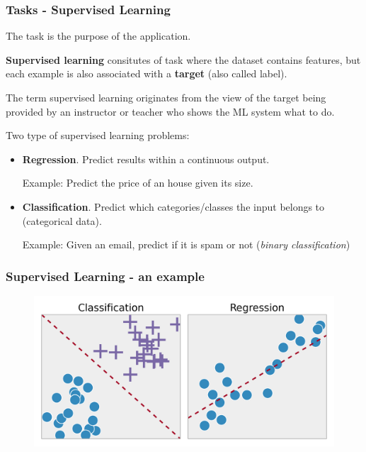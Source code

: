 \documentclass{beamer}
\begin{document}
	\begin{frame}
		\frametitle{Tasks - Supervised Learning}
		The task is the purpose of the application.
		
		\vspace{5mm}
		
		\textbf{Supervised learning} consitutes of task where the dataset contains features, but each example is also associated with a \textbf{target} (also called label).
		
		The term supervised learning originates from the view of the target being provided by an instructor or teacher who shows the ML system what to do.
		
		Two type of supervised learning problems:
		\begin{itemize}
			\item \textbf{Regression}. Predict results within a continuous output.
			
			Example: Predict the price of an house given its size.
			\item \textbf{Classification}.  Predict which categories/classes the input belongs to (categorical data).
			
			Example: Given an email, predict if it is spam or not (\textsl{binary classification})
		\end{itemize}
	\end{frame}

	\begin{frame}
		\frametitle{Supervised Learning - an example}
		\begin{figure}
			\centering
			\includegraphics[scale=0.22]{images/supervised-learning}
		\end{figure}
	\end{frame}
\end{document}
